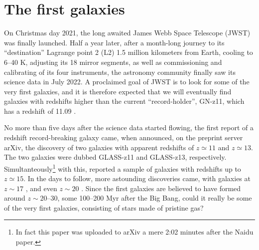 \documentclass[useAMS,usenatbib,bibyear]{aa}
\begin{document}

\section{The first galaxies}
\label{sec:jwst}

On Christmas day 2021, the long awaited James Webb Space Telescope (JWST) was finally launched.
Half a year later, after a month-long journey to its ``destination'' Lagrange point 2 (L2) 1.5 million kilometers from Earth, cooling to 6--40 K, adjusting its 18 mirror segments, as well as commissioning and calibrating of its four instruments, the astronomy community finally saw its science data in July 2022.
A proclaimed goal of JWST is to look for some of the very first galaxies, and it is therefore expected that we will eventually find galaxies with redshifts higher than the current ``record-holder'', GN-z11, which has a redshift of 11.09 \citep{Oesch2016}.

No more than five days after the science data started flowing, the first report of a redshift record-breaking galaxy came, when \citet{Naidu2022a} announced, on the preprint server arXiv, the discovery of two galaxies with apparent redshifts of $z\simeq11$ and $z\simeq13$.
The two galaxies were dubbed GLASS-z11 and GLASS-z13, respectively.
Simultanteously\footnote{In fact this paper was uploaded to arXiv a mere 2:02 minutes after the Naidu paper.} with this, \citet{Castellano2022} reported a sample of galaxies with redshifts up to $z\simeq15$.
In the days to follow, more astounding discoveries came, with galaxies at
$z\sim17$ \citep{Donnan2022,Harikane2022}, and even
$z\sim20$ \citep{Yan2022}.
Since the first galaxies are believed to have formed around $z\sim20\text{--}30$, some 100--200 Myr after the Big Bang, could it really be some of the very first galaxies, consisting of stars made of pristine gas?
\end{document}
